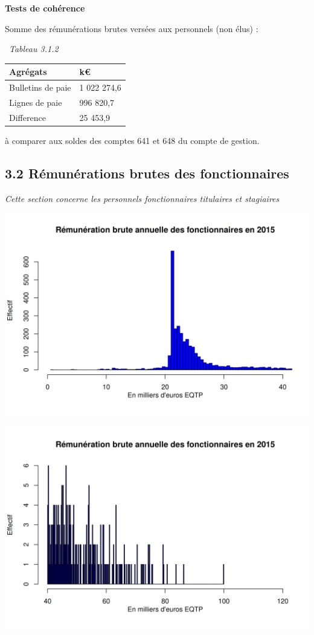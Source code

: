 \textbf{Tests de cohérence}

Somme des rémunérations brutes versées aux personnels (non élus) :

~\emph{Tableau 3.1.2}

\begin{longtable}[]{@{}ll@{}}
\toprule
Agrégats & k€\tabularnewline
\midrule
\endhead
Bulletins de paie & 1 022 274,6\tabularnewline
Lignes de paie & 996 820,7\tabularnewline
Difference & 25 453,9\tabularnewline
\bottomrule
\end{longtable}

à comparer aux soldes des comptes 641 et 648 du compte de gestion.

\hypertarget{remunerations-brutes-des-fonctionnaires-1}{%
\subsection{3.2 Rémunérations brutes des
fonctionnaires}\label{remunerations-brutes-des-fonctionnaires-1}}

\emph{Cette section concerne les personnels fonctionnaires titulaires et
stagiaires}

\includegraphics{altair_files/figure-latex/unnamed-chunk-76-1.png}

\includegraphics{altair_files/figure-latex/unnamed-chunk-76-2.png}

